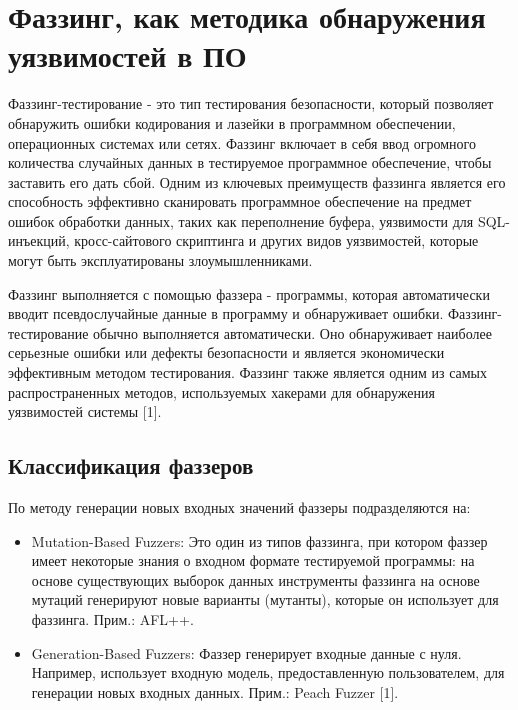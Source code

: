 \chapter{Фаззинг, как методика обнаружения уязвимостей в ПО} \label{ch1}


Фаззинг-тестирование - это тип тестирования безопасности, который позволяет обнаружить ошибки кодирования и лазейки в программном обеспечении, операционных системах или сетях. Фаззинг включает в себя ввод огромного количества случайных данных в тестируемое программное обеспечение, чтобы заставить его дать сбой. Одним из ключевых преимуществ фаззинга является его способность эффективно сканировать программное обеспечение на предмет ошибок обработки данных, таких как переполнение буфера, уязвимости для SQL-инъекций, кросс-сайтового скриптинга и других видов уязвимостей, которые могут быть эксплуатированы злоумышленниками. 
\par
Фаззинг выполняется с помощью фаззера - программы, которая автоматически вводит псевдослучайные данные в программу и обнаруживает ошибки. Фаззинг-тестирование обычно выполняется автоматически. Оно обнаруживает наиболее серьезные ошибки или дефекты безопасности и является экономически эффективным методом тестирования. Фаззинг также является одним из самых распространенных методов, используемых хакерами для обнаружения уязвимостей системы [1].


\section{Классификация фаззеров} \label{ch1:sec1}



По методу генерации новых входных значений фаззеры подразделяются на:
\begin{itemize}
	\item Mutation-Based Fuzzers: Это один из типов фаззинга, при котором фаззер имеет некоторые знания о входном формате тестируемой программы: на основе существующих выборок данных инструменты фаззинга на основе мутаций генерируют новые варианты (мутанты), которые он использует для фаззинга. Прим.: AFL++.
	\item Generation-Based Fuzzers: Фаззер генерирует входные данные с нуля. Например, использует входную модель, предоставленную пользователем, для генерации новых входных данных. Прим.: Peach Fuzzer [1].
\end{itemize}

